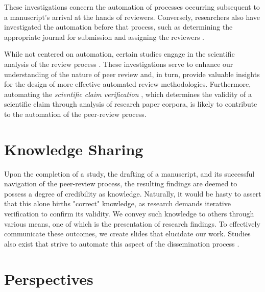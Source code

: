 \documentclass{book}
\begin{document}
These investigations concern the automation of processes occurring subsequent to a manuscript's arrival at the hands of reviewers. Conversely, researchers also have investigated the automation before that process, such as determining the appropriate journal for submission \cite{michail2023journal} and assigning the reviewers \cite{zhao2022reviewer}.

While not centered on automation, certain studies engage in the scientific analysis of the review process \cite{shah2022challenges,verma2021attend,bharti2022confident,bharti2022betterpr,verma2022lack,kennard2022disapere}. These investigations serve to enhance our understanding of the nature of peer review and, in turn, provide valuable insights for the design of more effective automated review methodologies. Furthermore, automating the \textit{scientific claim verification} \cite{li2019scientific,wadden2020fact,wadden2022scifact,wadden2022multivers}, which determines the validity of a scientific claim through analysis of research paper corpora, is likely to contribute to the automation of the peer-review process.

\section{Knowledge Sharing}

Upon the completion of a study, the drafting of a manuscript, and its successful navigation of the peer-review process, the resulting findings are deemed to possess a degree of credibility as knowledge. Naturally, it would be hasty to assert that this alone births "correct" knowledge, as research demands iterative verification to confirm its validity. We convey such knowledge to others through various means, one of which is the presentation of research findings. To effectively communicate these outcomes, we create slides that elucidate our work. Studies also exist that strive to automate this aspect of the dissemination process \cite{sefid2019automatic}.

\section{Perspectives}
\end{document}
